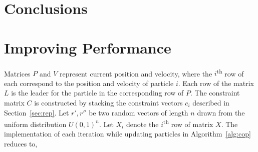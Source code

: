 \documentclass[10pt]{article}
\newcommand{\pso}{Particle Swarm Optimization}
\begin{document}
\begin{table}
  \centering
  \begin{subtable}{\textwidth}
    \centering
    
    \caption{Estimated habitability scores under DRS.}\label{tab:ceesadrs}
  \end{subtable}

  \vspace{4em}

  \begin{subtable}{\textwidth}
    \centering
    
    \caption{Estimated habitability scores under CRS.}\label{tab:ceesacrs}
  \end{subtable}
  \caption{Constant Elasticity Earth Similarity Approach scores as estimated by \pso.\\
      \footnotesize $r$, $d$, $t$, $v$, $e$, $\rho$ and $eta$ record the parameters of Equation~\ref{eq:ceesadrs} in
      Table~\ref{tab:ceesadrs} and the parameters of Equation~\ref{eq:ceesacrs} in Table~\ref{tab:ceesacrs}. However,
      since under the CRS constraint, $\eta=1$, there is no need for the parameter $\eta$ in the problem. The column
      $\mathit{CEESA}$ records the maxima of the objective function. $i$ specifies the number of iterations taken to
      converge to the maxima.
    }
\end{table}


\section{Conclusions}


\appendix


\section{Improving Performance}\label{app:imp}

Matrices $P$ and $V$ represent current position and velocity, where the $i$\textsuperscript{th} row of each correspond
to the position and velocity of particle $i$. Each row of the matrix $L$ is the leader for the particle in the
corresponding row of $P$. The constraint matrix $C$ is constructed by stacking the constraint vectors $c_i$ described in
Section~\ref{sec:rep}. Let $r',r''$ be two random vectors of length $n$ drawn from the uniform distribution
${U(0,1)}^n$. Let $X_i$ denote the $i$\textsuperscript{th} row of matrix $X$. The implementation of each iteration while
updating particles in Algorithm~\ref{alg:cop} reduces to,
\end{document}
